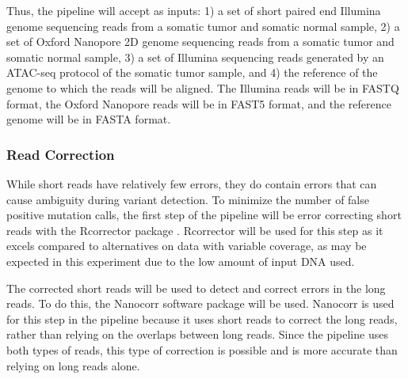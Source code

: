 Thus, the pipeline will accept as inputs: 1) a set of short paired end Illumina genome sequencing reads from a somatic tumor and somatic normal sample, 2) a set of Oxford Nanopore 2D genome sequencing reads from a somatic tumor and somatic normal sample, 3) a set of Illumina sequencing reads generated by an ATAC-seq protocol of the somatic tumor sample, and 4) the reference of the genome to which the reads will be aligned. The Illumina reads will be in FASTQ format, the Oxford Nanopore reads will be in FAST5 format, and the reference genome will be in FASTA format.

\subsubsection{Read Correction}
While short reads have relatively few errors, they do contain errors that can cause ambiguity during variant detection.
To minimize the number of false positive mutation calls, the first step of the pipeline will be error correcting short reads with the Rcorrector package \parencite{song_rcorrector:_2015}.
Rcorrector will be used for this step as it excels compared to alternatives on data with variable coverage, as may be expected in this experiment due to the low amount of input DNA used.



The corrected short reads will be used to detect and correct errors in the long reads. To do this, the Nanocorr \parencite{goodwin_oxford_2015} software package will be used.
Nanocorr is used for this step in the pipeline because it uses short reads to correct the long reads, rather than relying on the overlaps between long reads. Since the pipeline uses both types of reads, this type of correction is possible and is more accurate than relying on long reads alone.


